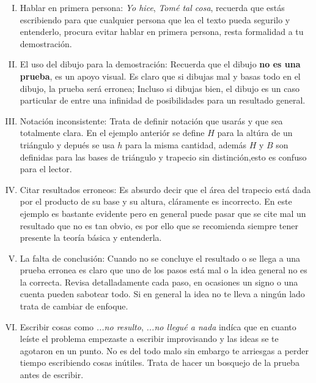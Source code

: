 \begin{enumerate}[I)]
  \item Hablar en primera persona:
    \textit{Yo hice},
    \textit{Tomé tal cosa},
      recuerda que estás escribiendo
      para que cualquier persona que lea el texto pueda
      segurilo y entenderlo,
      procura evitar hablar en primera persona,
      resta formalidad a tu demostración.

  \item El uso del dibujo para la demostración:
    Recuerda que el dibujo \textbf{no es una prueba},
    es un apoyo visual.
    Es claro que si dibujas mal y basas todo en el dibujo,
    la prueba será erronea;
    Incluso si dibujas bien,
    el dibujo es un caso particular de
    entre una infinidad de posibilidades para un resultado general.

  \item Notación inconsistente:
    Trata de definir notación que usarás
    y que sea totalmente clara.
    En el ejemplo anteriór se define $H$ para la altúra de un triángulo
    y depués se usa $h$ para la misma cantidad,
    además $H$ y $B$ son definidas para las bases de triángulo
    y trapecio sin distinción,esto es confuso para el lector.

  \item Citar resultados erroneos:
    Es absurdo decir que el área del trapecio está dada
    por el producto de su base y su altura,
    cláramente es incorrecto.
    En este ejemplo es bastante evidente
    pero en general puede pasar que se cite mal un resultado
    que no es tan obvio,
    es por ello que se recomienda
    siempre tener presente la teoría básica y entenderla.

  \item La falta de conclusión:
    Cuando no se concluye el resultado
    o se llega a una prueba erronea
    es claro que uno de los pasos está mal
    o la idea general no es la correcta.
    Revisa detalladamente cada paso,
    en ocasiones un signo o una cuenta pueden sabotear todo.
    Si en general la idea no te lleva a ningún lado
    trata de cambiar de enfoque.

  \item Escribir cosas como
    \textit{...no resulto}, \textit{...no llegué a nada}
    indíca que en cuanto leíste el problema
    empezaste a escribir improvisando
    y las ideas se te agotaron en un punto.
    No es del todo malo sin embargo te arriesgas a perder tiempo
    escribiendo cosas inútiles.
    Trata de hacer un bosquejo de la prueba antes de escribir.

\end{enumerate}

